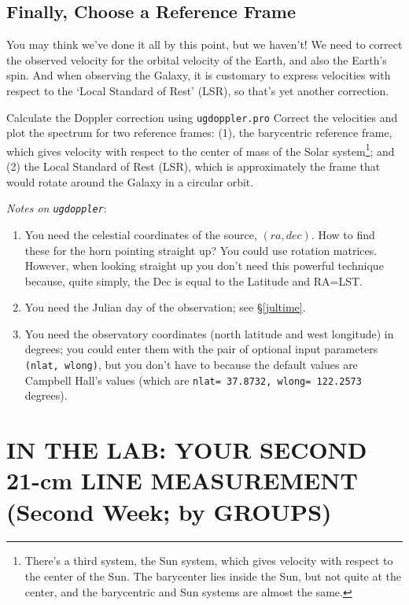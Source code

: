 \documentclass[12pt,preprint]{aastex}
\begin{document}
\subsection{Finally, Choose a Reference Frame}
You may think we've done it all by this point, but we haven't! We need
to correct the observed velocity for the orbital velocity of the Earth,
and also the Earth's spin. And when observing the Galaxy, it is
customary to express velocities with respect to the `Local Standard of
Rest' (LSR), so that's yet another correction.

Calculate the Doppler correction using {\tt ugdoppler.pro}  %
Correct the velocities and plot the spectrum for two
reference frames: (1), the barycentric reference frame, which gives
velocity with respect to the center of mass of the Solar
system\footnote{There's a third system, the Sun system, which gives
  velocity with respect to the center of the Sun. The barycenter lies
  inside the Sun, but not quite at the center, and the barycentric and
  Sun systems are almost the same.}; and (2) the Local Standard of Rest
(LSR), which is approximately the frame that would rotate around the
Galaxy in a circular orbit.

{\it Notes on \verb$ugdoppler$}: \begin{enumerate}

\item You need the celestial coordinates of the source, $(ra, dec)$. How
  to find these for the horn pointing straight up? You could use
  rotation matrices. However, when looking straight up you don't need
  this powerful technique because, quite simply, the Dec is equal to the
  Latitude and RA=LST.

\item You need the Julian day of the observation; see \S \ref{jultime}.

\item You need the observatory coordinates (north latitude and west
  longitude) in degrees; you could enter them with the pair of optional
  input parameters {\tt (nlat, wlong)}, but you don't have to because
  the default values are Campbell Hall's values (which are {\tt nlat=
  37.8732, wlong= 122.2573} degrees).

\end{enumerate}

\section{IN THE LAB: YOUR SECOND 21-cm LINE MEASUREMENT (Second Week; by
  GROUPS)} 
\label{meas2}
\end{document}
